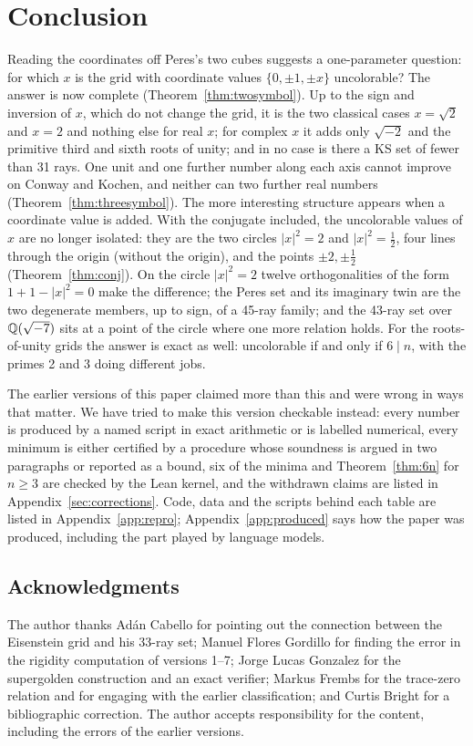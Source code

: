 \section{Conclusion}\label{sec:conclusion}

Reading the coordinates off Peres's two cubes suggests a one-parameter question: for which $x$
is the grid with coordinate values $\{0,\pm1,\pm x\}$ uncolorable?  The answer is now complete
(Theorem~\ref{thm:twosymbol}).  Up to the sign and inversion of $x$, which do not change the grid, it is the two classical cases
$x=\sqrt2$ and $x=2$ and nothing else for real $x$; for complex $x$ it adds only $\sqrt{-2}$ and
the primitive third and sixth roots of unity; and in no case is there a KS set of fewer than 31 rays.  One unit and one
further number along each axis cannot improve on Conway and Kochen, and neither can two further
real numbers (Theorem~\ref{thm:threesymbol}).  The more interesting
structure appears when a coordinate value is added.  With the conjugate
included, the uncolorable values of $x$ are no longer isolated: they are the two circles
$|x|^2=2$ and $|x|^2=\tfrac12$, four lines through the origin (without the origin), and the points
$\pm2,\pm\tfrac12$ (Theorem~\ref{thm:conj}).  On the circle $|x|^2=2$ twelve orthogonalities of the form $1+1-|x|^2=0$ make the difference; the Peres set
and its imaginary twin are the two degenerate members, up to sign, of a 45-ray family; and the 43-ray set over
$\mathbb{Q}(\sqrt{-7})$ sits at a point of the circle where one more relation holds.  For the
roots-of-unity grids the answer is exact as well: uncolorable if and only if $6\mid n$, with
the primes 2 and 3 doing different jobs.

The earlier versions of this paper claimed more than this and were wrong in ways that matter.
We have tried to make this version checkable instead: every number is produced by a named script
in exact arithmetic or is labelled numerical, every minimum is either certified by a procedure
whose soundness is argued in two paragraphs or reported as a bound, six of the minima and
Theorem~\ref{thm:6n} for $n\ge3$ are checked by the Lean kernel, and the withdrawn claims are listed in
Appendix~\ref{sec:corrections}.  Code, data and the scripts behind each table are listed in
Appendix~\ref{app:repro}; Appendix~\ref{app:produced} says how the paper was produced, including
the part played by language models.

\subsection*{Acknowledgments}

The author thanks Ad\'an Cabello for pointing out the connection between the Eisenstein grid
and his 33-ray set; Manuel Flores Gordillo for finding the error in the rigidity computation of
versions 1--7; Jorge Lucas Gonzalez for the supergolden construction and an exact verifier;
Markus Frembs for the trace-zero relation and for engaging with the earlier classification; and
Curtis Bright for a bibliographic correction.  The author accepts responsibility for the content,
including the errors of the earlier versions.
